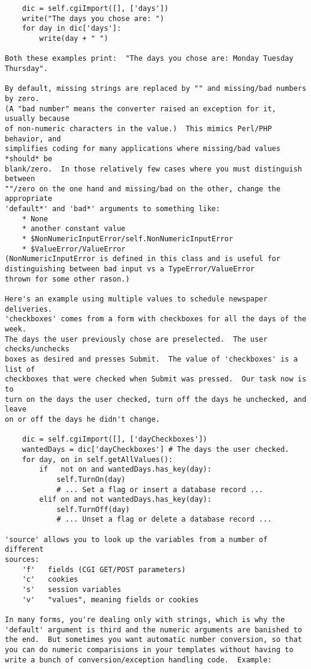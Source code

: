 \begin{verbatim}
    dic = self.cgiImport([], ['days'])
    write("The days you chose are: ")
    for day in dic['days']:
        write(day + " ")

Both these examples print:  "The days you chose are: Monday Tuesday Thursday".

By default, missing strings are replaced by "" and missing/bad numbers by zero.
(A "bad number" means the converter raised an exception for it, usually because
of non-numeric characters in the value.)  This mimics Perl/PHP behavior, and
simplifies coding for many applications where missing/bad values *should* be
blank/zero.  In those relatively few cases where you must distinguish between
""/zero on the one hand and missing/bad on the other, change the appropriate
'default*' and 'bad*' arguments to something like: 
    * None
    * another constant value
    * $NonNumericInputError/self.NonNumericInputError
    * $ValueError/ValueError
(NonNumericInputError is defined in this class and is useful for
distinguishing between bad input vs a TypeError/ValueError
thrown for some other rason.)

Here's an example using multiple values to schedule newspaper deliveries.
'checkboxes' comes from a form with checkboxes for all the days of the week.
The days the user previously chose are preselected.  The user checks/unchecks
boxes as desired and presses Submit.  The value of 'checkboxes' is a list of
checkboxes that were checked when Submit was pressed.  Our task now is to
turn on the days the user checked, turn off the days he unchecked, and leave
on or off the days he didn't change.

    dic = self.cgiImport([], ['dayCheckboxes'])
    wantedDays = dic['dayCheckboxes'] # The days the user checked.
    for day, on in self.getAllValues():
        if   not on and wantedDays.has_key(day):
            self.TurnOn(day)
            # ... Set a flag or insert a database record ...
        elif on and not wantedDays.has_key(day):
            self.TurnOff(day)
            # ... Unset a flag or delete a database record ...

'source' allows you to look up the variables from a number of different
sources:
    'f'   fields (CGI GET/POST parameters)
    'c'   cookies
    's'   session variables
    'v'   "values", meaning fields or cookies

In many forms, you're dealing only with strings, which is why the
'default' argument is third and the numeric arguments are banished to
the end.  But sometimes you want automatic number conversion, so that
you can do numeric comparisions in your templates without having to
write a bunch of conversion/exception handling code.  Example:


\end{verbatim}
